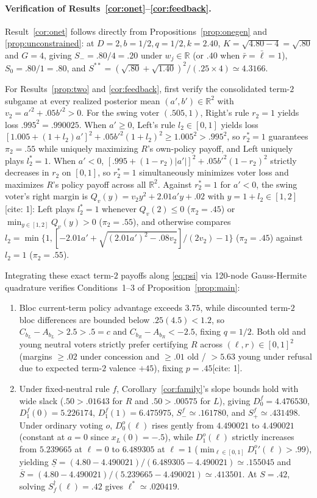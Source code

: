 \paragraph{Verification of Results~\ref{cor:onet}--\ref{cor:feedback}.}
Result~\ref{cor:onet} follows directly from Propositions~\ref{prop:onegen} and \ref{prop:unconstrained}: at $D=2,b=1/2,q=1/2,k=2.40$, $K=\sqrt{4.80-4}=\sqrt{.80}$ and $G=4$, giving $S_-=.80/4=.20$ under $w_j\in\mathbb R$ (or $.40$ when $\bar r=\bar\ell=1$), $S_0=.80/1=.80$, and $S^{**}=(\sqrt{.80}+\sqrt{1.40})^2/(.25\times 4)\simeq 4.3166$.

For Results~\ref{prop:two} and \ref{cor:feedback}, first verify the consolidated term-$2$ subgame at every realized posterior mean $(a',b')\in\mathbb R^2$ with $v_2=a'^2+.05b'^2>0$. For the swing voter $(.505,1)$, Right's rule $r_2=1$ yields loss $.995^2=.990025$. When $a'\ge 0$, Left's rule $l_2\in[0,1]$ yields loss $[1.005+(1+l_2)a']^2+.05b'^2(1+l_2)^2\ge 1.005^2>.995^2$, so $r_2^*=1$ guarantees $\pi_2=.55$ while uniquely maximizing $R$'s own-policy payoff, and Left uniquely plays $l_2^*=1$. When $a'<0$, $[.995+(1-r_2)|a'|]^2+.05b'^2(1-r_2)^2$ strictly decreases in $r_2$ on $[0,1]$, so $r_2^*=1$ simultaneously minimizes voter loss and maximizes $R$'s policy payoff across all $\mathbb R^2$. Against $r_2^*=1$ for $a'<0$, the swing voter's right margin is $Q_v(y)=v_2 y^2+2.01a'y+.02$ with $y=1+l_2\in[1,2]$[cite: 1]: Left plays $l_2^*=1$ whenever $Q_v(2)\le 0$ ($\pi_2=.45$) or $\min_{y\in[1,2]}Q_v(y)>0$ ($\pi_2=.55$), and otherwise compares $l_2=\min\{1,[-2.01a'+\sqrt{(2.01a')^2-.08v_2}]/(2v_2)-1\}$ ($\pi_2=.45$) against $l_2=1$ ($\pi_2=.55$).

Integrating these exact term-$2$ payoffs along \eqref{eq:psi} via 120-node Gauss-Hermite quadrature verifies Conditions~1--3 of Proposition~\ref{prop:main}:
\begin{enumerate}
\item Bloc current-term policy advantage exceeds $3.75$, while discounted term-$2$ bloc differences are bounded below $.25(4.5)<1.2$, so $C_{b_L}-A_{b_L}>2.5>.5=c$ and $C_{b_R}-A_{b_R}<-2.5$, fixing $q=1/2$. Both old and young neutral voters strictly prefer certifying $R$ across $(\ell,r)\in[0,1]^2$ (margins $\ge .02$ under concession and $\ge .01$ old / $>5.63$ young under refusal due to expected term-$2$ valence $+45$), fixing $p=.45$[cite: 1].
\item Under fixed-neutral rule $f$, Corollary~\ref{cor:family}'s slope bounds hold with wide slack ($.50>.01643$ for $R$ and $.50>.00575$ for $L$), giving $D_0^f=4.476530$, $D_1^f(0)=5.226174$, $D_1^f(1)=6.475975$, $S_-^f\simeq .161780$, and $S_+^f\simeq .431498$. Under ordinary voting $o$, $D_0^o(\ell)$ rises gently from $4.490021$ to $4.490021$ (constant at $a=0$ since $x_L(0)=-.5$), while $D_1^o(\ell)$ strictly increases from $5.239665$ at $\ell=0$ to $6.489305$ at $\ell=1$ ($\min_{\ell\in[0,1]}{D_1^o}'(\ell)>.99$), yielding $\underline S=(4.80-4.490021)/(6.489305-4.490021)\simeq .155045$ and $\overline S=(4.80-4.490021)/(5.239665-4.490021)\simeq .413501$. At $S=.42$, solving $S_f^\dagger(\ell)=.42$ gives $\ell^*\simeq .020419$.
\end{enumerate}

